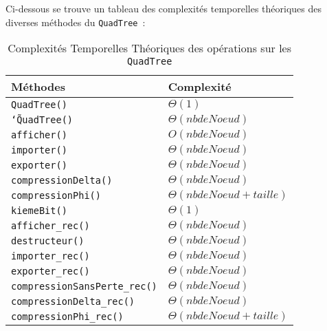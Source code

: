 \documentclass{article}
\newcommand{\info}{\texttt}
\newcommand{\qt}{\info{QuadTree}}
\begin{document}
        Ci-dessous se trouve un tableau des complexités temporelles théoriques des diverses méthodes du \qt\ :
        \begin{table}[H]
        	\centering
        	\label{ComplexiteTheo}
        	\begin{tabular}{|l|l|}
        		\hline
        		\rowcolor[HTML]{C0C0C0} 
        		{\color[HTML]{333333} \textbf{Méthodes}} & \textbf{Complexité} \\ \hline
        		\info{QuadTree()}                                 &  $\Theta(1)$                   \\ \hline
        		\info{\char`\~QuadTree()}                                &  $\Theta(nb de Noeud)$                   \\ \hline
        		\info{afficher()}                                &  $O(nb de Noeud)$                   \\ \hline
        		\info{importer()}                                 &  $\Theta(nb de Noeud)$                   \\ \hline
        		\info{exporter()}                               &  $\Theta(nb de Noeud)$                   \\ \hline
        		\info{compressionDelta()}                                &  $\Theta(nb de Noeud)$                   \\ \hline
        		\info{compressionPhi()}                                 &  $\Theta(nb de Noeud + taille)$                   \\ \hline
        		\info{kiemeBit()}                                 &  $\Theta(1)$                   \\ \hline
        		\info{afficher\_rec()}                                 &  $\Theta(nb de Noeud)$                   \\ \hline
        		\info{destructeur()}                                 &  $\Theta(nb de Noeud)$                   \\ \hline
        		\info{importer\_rec()}                                 &  $\Theta(nb de Noeud)$                   \\ \hline
        		\info{exporter\_rec()}                                 &  $\Theta(nb de Noeud)$                   \\ \hline
        		\info{compressionSansPerte\_rec()}                                 &  $\Theta(nb de Noeud)$                   \\ \hline
        		\info{compressionDelta\_rec()}                                 &  $\Theta(nb de Noeud)$                   \\ \hline
        		\info{compressionPhi\_rec()}                                 &  $\Theta(nb de Noeud + taille)$                   \\ \hline
        	\end{tabular}
        	\caption{Complexités Temporelles Théoriques des opérations sur les \qt}
        \end{table}
        
\end{document}
